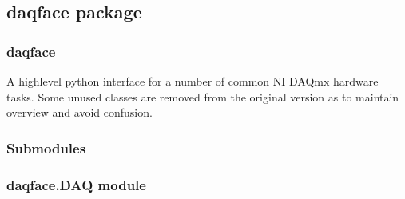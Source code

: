 \documentclass[letterpaper,10pt,english]{sphinxmanual}
\begin{document}
\sphinxstepscope


\subsection{daqface package}
\label{\detokenize{NoSeMazeController/daqface:daqface-package}}\label{\detokenize{NoSeMazeController/daqface::doc}}

\subsubsection{daqface}
\label{\detokenize{NoSeMazeController/daqface:daqface}}
\sphinxAtStartPar
A high\sphinxhyphen{}level python interface for a number of common NI DAQmx hardware tasks. Some unused classes are removed from the original version as to maintain overview and avoid confusion.


\subsubsection{Submodules}
\label{\detokenize{NoSeMazeController/daqface:submodules}}

\subsubsection{daqface.DAQ module}
\label{\detokenize{NoSeMazeController/daqface:module-daqface.DAQ}}\label{\detokenize{NoSeMazeController/daqface:daqface-daq-module}}
\end{document}
